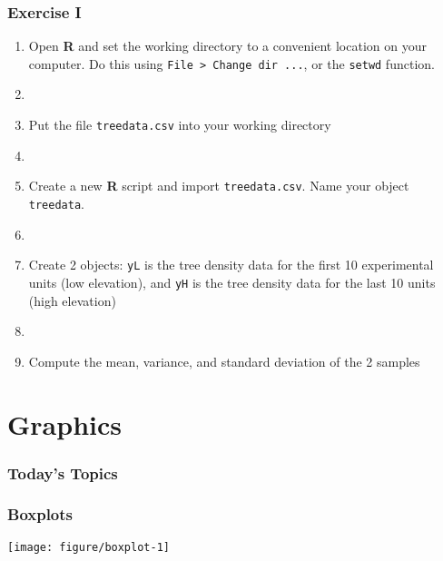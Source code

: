 \documentclass[color=usenames,dvipsnames]{beamer}\usepackage[]{graphicx}\usepackage[]{color}
\begin{document}




\begin{frame}[fragile]
  \frametitle{Exercise I}
  \large
  \begin{enumerate}[\bf (1)]
    \item<1-> Open {\bf R} and set the working directory to a convenient
      location on your computer. Do this using {\tt File > Change dir ...}, or the {\tt setwd} function.
    \item[]
    \item<2-> Put the file {\tt treedata.csv} into your working
      directory
    \item[]
    \item<3-> Create a new {\bf R} script and import {\tt treedata.csv}. Name your object {\tt treedata}.
    \item[]
    \item<4-> Create 2 objects: \verb+yL+ is the tree density data for the
      first 10 experimental units (low elevation), and \verb+yH+ is the tree density
      data for the last 10 units (high elevation)
    \item[]
    \item<5-> Compute the mean, variance, and standard deviation of the 2 samples
  \end{enumerate}
\end{frame}









\section{Graphics}



\begin{frame}[plain]
  \frametitle{Today's Topics}
  \Large
\end{frame}






\begin{frame}[fragile]
  \frametitle{Boxplots}
  \begin{center}
  \footnotesize

\vspace{-3mm}
\texttt{[image: figure/boxplot-1]}
  \end{center}
\end{frame}
\end{document}
